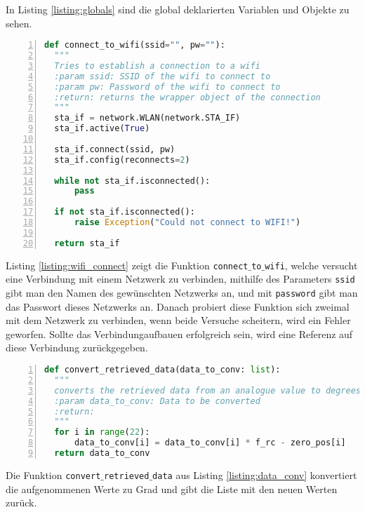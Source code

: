 \documentclass[paper=a4,12pt]{scrreprt}
\begin{document}
In Listing \ref{listing:globals} sind die global deklarierten Variablen und Objekte zu sehen.\newline

\begin{lstlisting}[caption={Firmware: WIFI-Connect Routine}, captionpos=b, label={listing:wifi_connect}, language=python, morekeywords={async, await, False, True, None}, numbers=left,
  stepnumber=1]
def connect_to_wifi(ssid="", pw=""):
  """
  Tries to establish a connection to a wifi
  :param ssid: SSID of the wifi to connect to
  :param pw: Password of the wifi to connect to
  :return: returns the wrapper object of the connection
  """
  sta_if = network.WLAN(network.STA_IF)
  sta_if.active(True)

  sta_if.connect(ssid, pw)
  sta_if.config(reconnects=2)

  while not sta_if.isconnected():
      pass

  if not sta_if.isconnected():
      raise Exception("Could not connect to WIFI!")

  return sta_if
\end{lstlisting}

Listing \ref{listing:wifi_connect} zeigt die Funktion \texttt{connect$\_$to$\_$wifi}, welche versucht eine Verbindung mit einem Netzwerk zu verbinden, mithilfe des Parameters \texttt{ssid} gibt man den
Namen des gewünschten Netzwerks an, und mit \texttt{password} gibt man das Passwort dieses Netzwerks an.\newline
Danach probiert diese Funktion sich zweimal mit dem Netzwerk zu verbinden, wenn beide Versuche scheitern, wird ein Fehler geworfen. Sollte das Verbindungaufbauen erfolgreich sein, wird eine
Referenz auf diese Verbindung zurückgegeben.\newline

\begin{lstlisting}[caption={Firmware: Datenkonvertierung}, captionpos=b, label={listing:data_conv}, language=python, morekeywords={async, await, False, True, None}, numbers=left,
  stepnumber=1]
def convert_retrieved_data(data_to_conv: list):
  """
  converts the retrieved data from an analogue value to degrees
  :param data_to_conv: Data to be converted
  :return:
  """
  for i in range(22):
      data_to_conv[i] = data_to_conv[i] * f_rc - zero_pos[i]
  return data_to_conv
\end{lstlisting}

Die Funktion \texttt{convert$\_$retrieved$\_$data} aus Listing \ref{listing:data_conv} konvertiert die aufgenommenen Werte zu Grad und gibt die Liste mit den neuen Werten zurück.\newline
\end{document}
